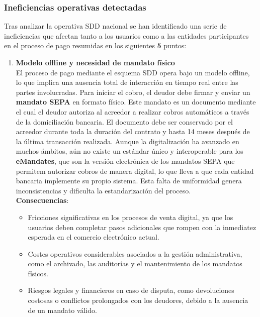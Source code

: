 \subsubsection{Ineficiencias operativas detectadas}
\label{subsec:ineficiencias}

Tras analizar la operativa SDD nacional se han identificado una serie de ineficiencias que afectan tanto a los usuarios como a las entidades participantes en el proceso de pago resumidas en los siguientes \textbf{5} puntos:
\begin{enumerate}[label=\textbf{\arabic*.}, leftmargin=0.75cm]
      \item \textbf{Modelo offline y necesidad de mandato físico}\\
            El proceso de pago mediante el esquema SDD opera bajo un modelo offline, lo que implica una ausencia total de interacción en tiempo real entre las partes involucradas. Para iniciar el cobro, el deudor debe firmar y enviar un \textbf{mandato SEPA} en formato físico. Este mandato es un documento mediante el cual el deudor autoriza al acreedor a realizar cobros automáticos a través de la domiciliación bancaria. El documento debe ser conservado por el acreedor durante toda la duración del contrato y hasta 14 meses después de la última transacción realizada. Aunque la digitalización ha avanzado en muchos ámbitos, aún no existe un estándar único y interoperable para los \textbf{eMandates}, que son la versión electrónica de los mandatos SEPA que permitem autorizar cobros de manera digital, lo que lleva a que cada entidad bancaria implemente su propio sistema. Esta falta de uniformidad genera inconsistencias y dificulta la estandarización del proceso.\\
            \textbf{Consecuencias}:
      \begin{itemize}
            \item Fricciones significativas en los procesos de venta digital, ya que los usuarios deben completar pasos adicionales que rompen con la inmediatez esperada en el comercio electrónico actual.
            \item Costes operativos considerables asociados a la gestión administrativa, como el archivado, las auditorías y el mantenimiento de los mandatos físicos.
            \item Riesgos legales y financieros en caso de disputa, como devoluciones costosas o conflictos prolongados con los deudores, debido a la ausencia de un mandato válido.
      \end{itemize}


\end{enumerate}
